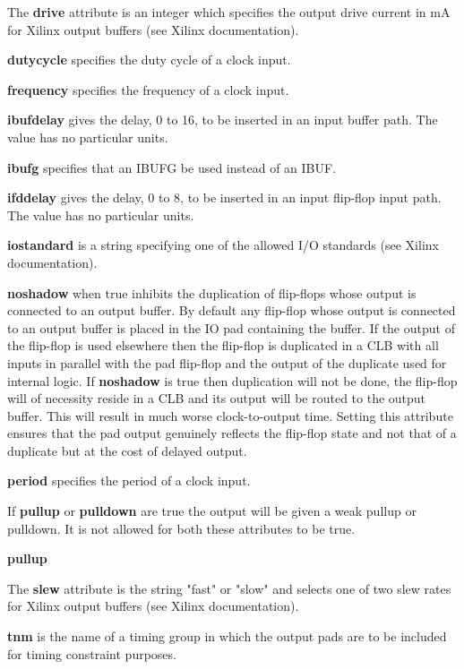         The {\bf drive} attribute is an integer which specifies the output drive
        current in mA for Xilinx output buffers (see Xilinx documentation).
        
        {\bf dutycycle} specifies the duty cycle of a clock input.
        
        {\bf frequency} specifies the frequency of a clock input.
        
        {\bf ibufdelay} gives the delay, 0 to 16, to be inserted in an input
        buffer path. The value has no particular units.
        
        {\bf ibufg} specifies that an IBUFG be used instead of an IBUF.
        
        {\bf ifddelay} gives the delay, 0 to 8, to be inserted in an input
        flip-flop input path. The value has no particular units.
        
        {\bf iostandard} is a string specifying one of the allowed
        I/O standards (see Xilinx documentation).
        
        {\bf noshadow} when true inhibits the duplication of flip-flops
        whose output is connected to an output buffer. By default any
        flip-flop whose output is connected to an output buffer is placed
        in the IO pad containing the buffer. If the output of the flip-flop
        is used elsewhere then the flip-flop is duplicated in a CLB with
        all inputs in parallel with the pad flip-flop and the output of the
        duplicate used for internal logic. If {\bf noshadow} is true then
        duplication will not be done, the flip-flop will of necessity
        reside in a CLB and its output will be routed to the output buffer.
        This will result in much worse clock-to-output time. Setting this
        attribute ensures that the pad output genuinely reflects the
        flip-flop state and not that of a duplicate but at the cost of
        delayed output.
        
        {\bf period} specifies the period of a clock input.
        
        If {\bf pullup} or {\bf pulldown} are true the output will be given
        a weak pullup or pulldown. It is not allowed for both these
        attributes to be true.
        
        {\bf pullup}
        
        The {\bf slew} attribute is the string "fast" or "slow" and selects
        one of two slew rates for Xilinx output buffers (see Xilinx documentation).
        
        {\bf tnm} is the name of a timing group in which the output pads
        are to be included for timing constraint purposes.
        
